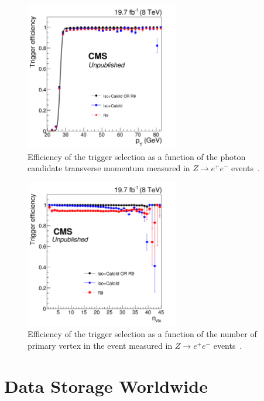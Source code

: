 \begin{figure}[ht]
 \begin{center}
    \includegraphics[width=0.60\textwidth]{figures/data/turnon_pt.pdf}
      \end{center}
\caption{Efficiency of the trigger selection as a function of the photon candidate transverse
momentum measured in $Z\rightarrow e^+ e^-$ events~\cite{HggCMSpaper}.}
\label{fig:ZeeTriggerPt}
\end{figure}

\begin{figure}[ht]
 \begin{center}
    \includegraphics[width=0.60\textwidth]{figures/data/turnon_nvtx.pdf}
      \end{center}
\caption{Efficiency of the trigger selection as a function of the number of primary vertex in the event
measured in $Z\rightarrow e^+ e^-$ events~\cite{HggCMSpaper}.}
\label{fig:ZeeTriggerNvtx}
\end{figure}


\section{Data Storage Worldwide\label{sec:storage}}

